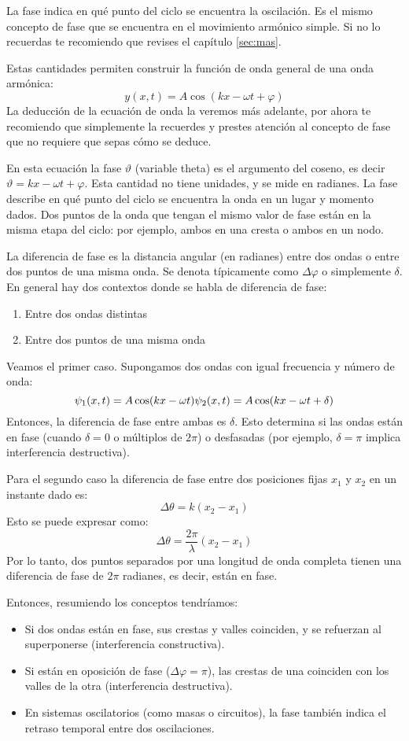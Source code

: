 La fase indica en qué punto del ciclo se encuentra la oscilación. Es el mismo concepto de fase que se encuentra en el movimiento armónico simple. Si no lo recuerdas te recomiendo que revises el capítulo \ref{sec:mas}.

Estas cantidades permiten construir la función de onda general de una onda armónica:
\[
y(x, t) = A \cos(kx - \omega t + \varphi)
\]
La deducción de la ecuación de onda la veremos más adelante, por ahora te recomiendo que simplemente la recuerdes y prestes atención al concepto de fase que no requiere que sepas cómo se deduce.

En esta ecuación la fase \(\vartheta\) (variable theta) es el argumento del coseno, es decir \(\vartheta = kx - \omega t + \varphi\). Esta cantidad no tiene unidades, y se mide en radianes. La fase describe en qué punto del ciclo se encuentra la onda en un lugar y momento dados. Dos puntos de la onda que tengan el mismo valor de fase están en la misma etapa del ciclo: por ejemplo, ambos en una cresta o ambos en un nodo.

La diferencia de fase es la distancia angular (en radianes) entre dos ondas o entre dos puntos de una misma onda. Se denota típicamente como \(\Delta \varphi\) o simplemente \(\delta\). En general hay dos contextos donde se habla de diferencia de fase:
\begin{enumerate}
  \item Entre dos ondas distintas
  \item Entre dos puntos de una misma onda
\end{enumerate}

Veamos el primer caso. Supongamos dos ondas con igual frecuencia y número de onda:
\[
\psi_1(x,t) = A \cos(kx - \omega t) \\
\psi_2(x,t) = A \cos(kx - \omega t + \delta)
\]
Entonces, la diferencia de fase entre ambas es \(\delta\). Esto determina si las ondas están en fase (cuando \(\delta = 0\) o múltiplos de \(2\pi\)) o desfasadas (por ejemplo, \(\delta = \pi\) implica interferencia destructiva).

Para el segundo caso la diferencia de fase entre dos posiciones fijas \(x_1\) y \(x_2\) en un instante dado es:
\[
\Delta \theta = k(x_2 - x_1)
\]
Esto se puede expresar como:
\[
\Delta \theta = \frac{2\pi}{\lambda} (x_2 - x_1)
\]
Por lo tanto, dos puntos separados por una longitud de onda completa tienen una diferencia de fase de \(2\pi\) radianes, es decir, están en fase.

Entonces, resumiendo los conceptos tendríamos:
\begin{itemize}
  \item Si dos ondas están en fase, sus crestas y valles coinciden, y se refuerzan al superponerse (interferencia constructiva).
  \item Si están en oposición de fase ($\Delta \varphi = \pi$), las crestas de una coinciden con los valles de la otra (interferencia destructiva).
  \item En sistemas oscilatorios (como masas o circuitos), la fase también indica el retraso temporal entre dos oscilaciones.
\end{itemize}

